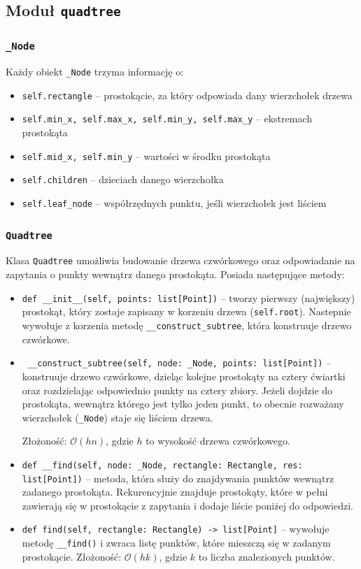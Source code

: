 \documentclass[12pt]{scrartcl}
\newcommand{\sO}{\mathcal O}
\begin{document}
\subsection{Moduł \texttt{quadtree}}
\subsubsection{\texttt{\_Node}}
Każdy obiekt \texttt{\_Node} trzyma informację o:
\begin{itemize}
    \item \texttt{self.rectangle} -- prostokącie, za który odpowiada dany wierzchołek drzewa
    \item \texttt{self.min\_x, self.max\_x, self.min\_y, self.max\_y} -- ekstremach prostokąta
    \item \texttt{self.mid\_x, self.min\_y} -- wartości w środku prostokąta
    \item \texttt{self.children} -- dzieciach danego wierzchołka
    \item \texttt{self.leaf\_node} -- współrzędnych punktu, jeśli wierzchołek jest liściem
\end{itemize}

\subsubsection{\texttt{Quadtree}}
Klasa \texttt{Quadtree} umożliwia budowanie drzewa czwórkowego oraz odpowiadanie na zapytania o punkty wewnątrz danego prostokąta. Posiada następujące metody:
\begin{itemize}
    \item \texttt{def \_\_init\_\_(self, points: list[Point])} -- tworzy pierwszy (największy) prostokąt, który zostaje zapisany w korzeniu drzewa (\texttt{self.root}). Nastepnie wywołuje z korzenia metodę \texttt{\_\_construct\_subtree}, która konstruuje drzewo czwórkowe.
    \item \texttt{ \_\_construct\_subtree(self, node: \_Node, points: list[Point])} -- konstruuje drzewo czwórkowe, dzieląc kolejne prostokąty na cztery ćwiartki oraz rozdzielając odpowiednio punkty na cztery zbiory. Jeżeli dojdzie do prostokąta, wewnątrz którego jest tylko jeden punkt, to obecnie rozważany wierzchołek (\texttt{\_Node}) staje się liściem drzewa.

    Złożoność: $\sO(hn)$, gdzie $h$ to wysokość drzewa czwórkowego.
    \item  \texttt{def \_\_find(self, node: \_Node, rectangle: Rectangle, res: list[Point])} -- metoda, która służy do znajdywania punktów wewnątrz zadanego prostokąta. Rekurencyjnie znajduje prostokąty, które w pełni zawierają się w prostokącie z zapytania i dodaje liście poniżej do odpowiedzi.
    \item \texttt{def find(self, rectangle: Rectangle) -> list[Point]} -- wywołuje metodę \texttt{\_\_find()} i zwraca listę punktów, które mieszczą się w zadanym prostokącie. Złożoność: $\sO(hk)$, gdzie $k$ to liczba znalezionych punktów.
\end{itemize}
\end{document}
